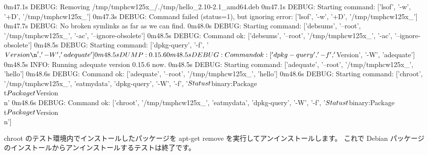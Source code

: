 \documentclass[mingoth,a4paper]{jsarticle}
\begin{document}
\begin{commandline}
0m47.1s DEBUG: Removing /tmp/tmphcw125x_/./tmp/hello_2.10-2.1_amd64.deb
0m47.1s DEBUG: Starting command: ['lsof', '-w', '+D', '/tmp/tmphcw125x_']
0m47.3s DEBUG: Command failed (status=1), but ignoring error: ['lsof', '-w', '+D', '/tmp/tmphcw125x_']
0m47.7s DEBUG: No broken symlinks as far as we can find.
0m48.0s DEBUG: Starting command: ['debsums', '--root', '/tmp/tmphcw125x_', '-ac', '--ignore-obsolete']
0m48.5s DEBUG: Command ok: ['debsums', '--root', '/tmp/tmphcw125x_', '-ac', '--ignore-obsolete']
0m48.5s DEBUG: Starting command: ['dpkg-query', '-f', '${Version}\n', '-W', 'adequate']
0m48.5s DUMP:
  0.15.6
0m48.5s DEBUG: Command ok: ['dpkg-query', '-f', '${Version}\n', '-W', 'adequate']
0m48.5s INFO: Running adequate version 0.15.6 now.
0m48.5s DEBUG: Starting command: ['adequate', '--root', '/tmp/tmphcw125x_', 'hello']
0m48.6s DEBUG: Command ok: ['adequate', '--root', '/tmp/tmphcw125x_', 'hello']
0m48.6s DEBUG: Starting command: ['chroot', '/tmp/tmphcw125x_', 'eatmydata', 'dpkg-query', '-W',
'-f', '${Status}\\t${binary:Package}\\t${Package}\\t${Version}\\n'
0m48.6s DEBUG: Command ok: ['chroot', '/tmp/tmphcw125x_', 'eatmydata', 'dpkg-query', '-W',
'-f', '${Status}\\t${binary:Package}\\t${Package}\\t${Version}\\n']
\end{commandline}

chroot のテスト環境内でインストールしたパッケージを apt-get remove を実行してアンインストールします。
これで Debian パッケージのインストールからアンインストールするテストは終了です。
\end{document}
